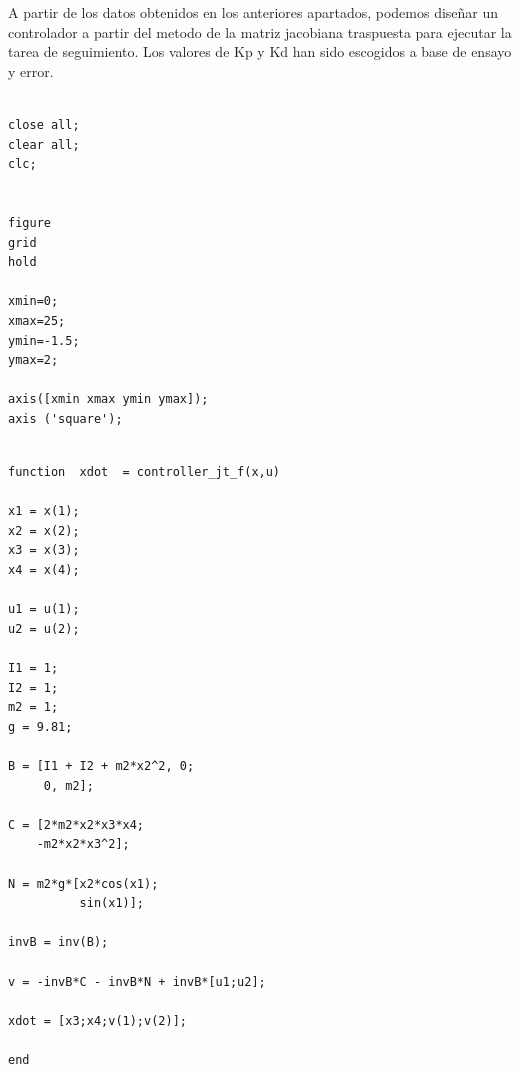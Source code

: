 \documentclass{article}
\begin{document}
\begin{itemize}
\bigskip
A partir de los datos obtenidos en los anteriores apartados, podemos diseñar un controlador a partir del metodo de la matriz jacobiana traspuesta para ejecutar la tarea de seguimiento.
Los valores de Kp y Kd han sido escogidos a base de ensayo y error.
\bigskip


\begin{tcolorbox}
[
title={File \texttt{controller\_jt\_init.m}}   
]
\begin{scriptsize}
\begin{verbatim}

close all; 
clear all; 
clc;


figure
grid
hold

xmin=0;
xmax=25;
ymin=-1.5;
ymax=2;

axis([xmin xmax ymin ymax]); 
axis ('square');

\end{verbatim}
\end{scriptsize}
\end{tcolorbox}

\begin{tcolorbox}
[
title={File \texttt{controller\_jt\_f.m}}      
]
\begin{scriptsize}
\begin{verbatim}

function  xdot  = controller_jt_f(x,u)

x1 = x(1);
x2 = x(2);
x3 = x(3);
x4 = x(4);

u1 = u(1);
u2 = u(2);

I1 = 1;
I2 = 1;
m2 = 1;
g = 9.81;

B = [I1 + I2 + m2*x2^2, 0;
     0, m2];

C = [2*m2*x2*x3*x4;
    -m2*x2*x3^2];

N = m2*g*[x2*cos(x1);
          sin(x1)];

invB = inv(B);

v = -invB*C - invB*N + invB*[u1;u2];

xdot = [x3;x4;v(1);v(2)];

end

\end{verbatim}
\end{scriptsize}
\end{tcolorbox}

\begin{tcolorbox}
[
title={File \texttt{draw\_circle.m}}      
]
\begin{scriptsize}
\begin{verbatim}


\end{verbatim}
\end{scriptsize}
\end{tcolorbox}
\end{itemize}
\end{document}

